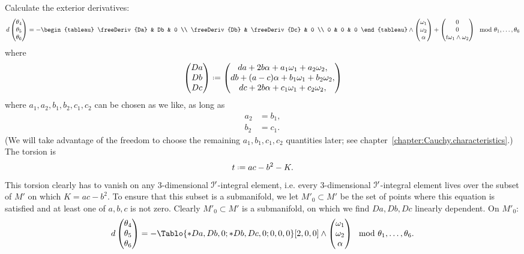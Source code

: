 Calculate the exterior derivatives:
\[
d
\begin{pmatrix}
  \theta_4 \\
  \theta_5 \\
  \theta_6 
\end{pmatrix}
=
-
\begin{tableau}
\freeDeriv{Da} & Db & 0 \\
\freeDeriv{Db} & \freeDeriv{Dc} & 0 \\
0 & 0 & 0
\end{tableau}
\wedge 
\begin{pmatrix}
  \pf_1 \\
  \pf_2 \\
  \alpha
\end{pmatrix}
+
\begin{pmatrix}
0 \\
0 \\
t \pf_1 \wedge \pf_2
\end{pmatrix}
\mod{\theta_1,\dots,\theta_6}
\]
where 
\[
\begin{pmatrix}
Da \\
Db \\
Dc
\end{pmatrix}
\defeq 
\begin{pmatrix}
da + 2b\alpha + a_1 \pf_1 + a_2 \pf_2, \\
db + (a-c)\alpha + b_1 \pf_1 + b_2 \pf_2, \\
dc + 2b \alpha  + c_1 \pf_1 + c_2 \pf_2,
\end{pmatrix}
\]
where \(a_1,a_2,b_1,b_2,c_1,c_2\) can be chosen as we like, as long as
\begin{align*}
a_2 &= b_1, \\
b_2 &= c_1.
\end{align*}
(We will take advantage of the freedom to choose the remaining \(a_1,b_1,c_1,c_2\) quantities later; see chapter~\ref{chapter:Cauchy.characteristics}.)
The torsion is
\[
t\defeq ac-b^2-K.
\]
This torsion clearly has to vanish on any \(3\)-dimensional \(\mathcal{I}'\)-integral element, i.e. every \(3\)-dimensional \(\mathcal{I}'\)-integral element lives over the subset of \(M'\) on which 
\(K=ac-b^2\).
To ensure that this subset is a submanifold, we let \(M'_0 \subset M'\) be the set of points where this equation is satisfied and at least one of \(a,b,c\) is not zero.
Clearly  \(M'_0 \subset M'\) is a submanifold, on which we find \(Da, Db, Dc\) linearly dependent.
On \(M'_0\):
\[
d
\begin{pmatrix}
  \theta_4 \\
  \theta_5 \\
  \theta_6 
\end{pmatrix}
=
-
\Tablo{*Da,Db,0;*Db,Dc,0;0,0,0}[2,0,0]
\wedge 
\begin{pmatrix}
  \pf_1 \\
  \pf_2 \\
  \alpha
\end{pmatrix}
\mod{\theta_1,\dots,\theta_6}.
\]
